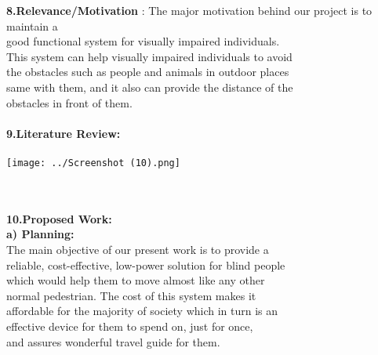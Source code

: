 \documentclass[12pt]{article}
\begin{document}
\begin{tabbing}
		
		\textbf{8.Relevance/Motivation}\>  : The major motivation behind our project is to maintain a\\ \hspace{5.4cm} good functional system for visually impaired individuals.\\ \hspace{5.4cm}  This system can help visually impaired individuals to avoid\\ \hspace{5.4cm} the obstacles such as people and animals in outdoor places\\ \hspace{5.4cm} same with them, and it also can provide the distance of the\\ \hspace{5.4cm} obstacles in front of them.                  \\
		\\
		
		
		\textbf{9.Literature Review: }\>                 \\
		\\
		\texttt{[image: ../Screenshot (10).png]}
		
		\\
		\\
		
		
		
		\textbf{10.Proposed Work: }\>  \\    
		
		
		
		
		
		\hspace{1in} \textbf{a) Planning:}\>  \\ \hspace{5.4cm} The main objective of our present work is to provide a\\ \hspace{5.4cm} reliable, cost-effective, low-power solution for blind people\\ \hspace{5.4cm} which would help them to move almost like any other\\ \hspace{5.4cm} normal pedestrian. The cost of this system makes it \\ \hspace{5.4cm} affordable for the majority of society which in turn is an\\ \hspace{5.4cm} effective device for them to spend on, just for once,\\ \hspace{5.4cm} and assures wonderful travel guide for them. \\
		

\end{tabbing}
\end{document}
